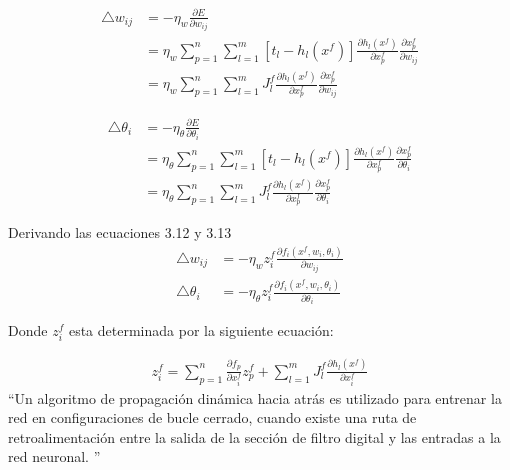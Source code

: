 \begin{equation}
	\begin{aligned}
	\bigtriangleup w_{ij}&=-\eta_{w}\frac{\partial E}{\partial w_{ij}} \\
	&=\eta_{w} \sum_{p=1}^{n} \sum_{l=1}^{m}[t_{l}-h_{l}(x^f)]\frac{\partial h_{l}(x^f)}{\partial x_{p}^f} \frac{\partial x_{p}^f}{\partial w_{ij}}\\
	&=\eta_{w} \sum_{p=1}^{n} \sum_{l=1}^{m}J_{l}^{f}\frac{\partial h_{l}(x^f)}{\partial x_{p}^f} \frac{\partial x_{p}^f}{\partial w_{ij}}
	\end{aligned}
\end{equation}

\begin{equation}
\begin{aligned}
\bigtriangleup \theta_{i}&=-\eta_{\theta}\frac{\partial E}{\partial \theta_{i}} \\
&=\eta_{\theta} \sum_{p=1}^{n} \sum_{l=1}^{m}[t_{l}-h_{l}(x^f)]\frac{\partial h_{l}(x^f)}{\partial x_{p}^f} \frac{\partial x_{p}^f}{\partial \theta_{i}}\\
&=\eta_{\theta} \sum_{p=1}^{n} \sum_{l=1}^{m}J_{l}^{f}\frac{\partial h_{l}(x^f)}{\partial x_{p}^f} \frac{\partial x_{p}^f}{\partial \theta_{i}}
\end{aligned}
\end{equation}

Derivando las ecuaciones 3.12 y 3.13
\begin{equation}
\begin{aligned}
\bigtriangleup w_{ij}&=-\eta_{w}z_{i}^f \frac{\partial f_{i}(x^f,w_{i},\theta_{i})}{\partial w_{ij}}\\
\bigtriangleup \theta_{i}&=-\eta_{\theta}z_{i}^{f}\frac{\partial f_{i}(x^f,w_{i},\theta_{i})}{\partial \theta_{i}} 
\end{aligned}
\end{equation}

Donde $z_{i}^f$ esta determinada por la siguiente ecuación:

\begin{equation}
\begin{aligned}
z_{i}^f =\sum_{p=1}^{n} \frac{\partial f_{p}}{\partial x_{i}^f}z_{p}^{f} + \sum_{l=1}^{m} J_{l}^f \frac{\partial h_{l}(x^f)}{\partial x_{i}^f}
\end{aligned}
\end{equation}
\newpage
\textquotedblleft Un algoritmo de propagación dinámica hacia atrás es utilizado para entrenar la red en configuraciones de bucle cerrado, cuando existe una ruta de retroalimentación entre la salida de la sección de filtro digital y las entradas a la red neuronal. \textquotedblright \cite{DBP}
